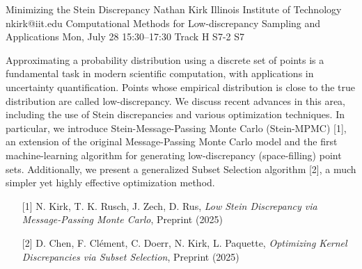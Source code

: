 \begin{talk}
  {Minimizing the Stein Discrepancy}%
  {Nathan Kirk}%
  {Illinois Institute of Technology}%
  {nkirk@iit.edu}%
  {Computational Methods for Low-discrepancy Sampling and Applications}%
  {}%
  {Mon, July 28 15:30–17:30 Track H}%
  {S7-2}%
  {S7}%
				
			
Approximating a probability distribution using a discrete set of points is a fundamental task in modern scientific computation, with applications in uncertainty quantification. Points whose empirical distribution is close to the true distribution are called low-discrepancy. We discuss recent advances in this area, including the use of Stein discrepancies and various optimization techniques. In particular, we introduce Stein-Message-Passing Monte Carlo (Stein-MPMC) [1], an extension of the original Message-Passing Monte Carlo model and the first machine-learning algorithm for generating low-discrepancy (space-filling) point sets. Additionally, we present a generalized Subset Selection algorithm [2], a much simpler yet highly effective optimization method.

\medskip

\begin{enumerate}
	\item[{[1]}] N. Kirk, T. K. Rusch, J. Zech, D. Rus, \textit{Low Stein Discrepancy via Message-Passing Monte Carlo}, Preprint (2025)
	\item[{[2]}] D. Chen, F. Clément, C. Doerr, N. Kirk, L. Paquette, \textit{Optimizing Kernel Discrepancies via Subset Selection}, Preprint (2025)
\end{enumerate}


\end{talk}

